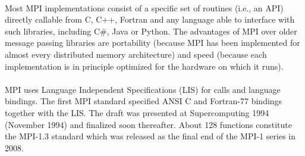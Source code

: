 \documentclass[10pt,a4paper]{article}
\begin{document}
\paragraph{} Most MPI implementations consist of a specific set of routines (i.e., an API) directly callable from C, C++, Fortran and any language able to interface with such libraries, including C\#, Java or Python. The advantages of MPI over older message passing libraries are portability (because MPI has been implemented for almost every distributed memory architecture) and speed (because each implementation is in principle optimized for the hardware on which it runs). 
\paragraph{} MPI uses Language Independent Specifications (LIS) for calls and language bindings. The first MPI standard specified ANSI C and Fortran-77 bindings together with the LIS. The draft was presented at Supercomputing 1994 (November 1994) and finalized soon thereafter. About 128 functions constitute the MPI-1.3 standard which was released as the final end of the MPI-1 series in 2008.
\end{document}
